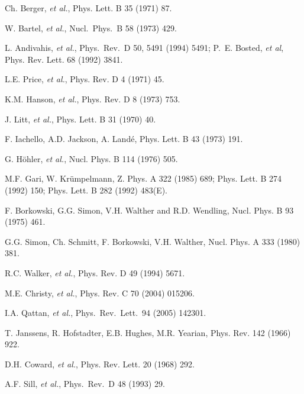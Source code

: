 \begin{thebibliography}{PPV06}
Ch. Berger, {\it et al.}, Phys. Lett. B  35 (1971) 87.

W. Bartel, {\it et al.},
Nucl.\ Phys.\ B  58 (1973) 429.

L. Andivahis, {\it et al.},
Phys.\ Rev.\ D  50, 5491 (1994) 5491;
P.~E. Bosted, {\it et al}, Phys. Rev. Lett.  68 (1992) 3841. 

L.E. Price, {\it et al.}, Phys. Rev. D  4 (1971) 45.

K.M. Hanson, {\it et al.}, Phys. Rev. D  8 (1973) 753.

J. Litt, {\it et al.}, Phys. Lett. B  31 (1970) 40.

F. Iachello, A.D. Jackson, A. Land\'e, Phys. Lett. B  43 (1973) 191. 

G. H\"ohler, {\it et al.}, Nucl. Phys. B  114 (1976) 505.

M.F. Gari, W. Kr\"umpelmann, Z. Phys. A  322 (1985) 689; 
Phys. Lett. B  274 (1992) 150; 
Phys. Lett. B  282 (1992) 483(E).

F. Borkowski, G.G. Simon, V.H. Walther and R.D. Wendling, Nucl. Phys. B  93 (1975) 461.

G.G. Simon, Ch. Schmitt, F. Borkowski, V.H. Walther, Nucl. Phys. A  333 (1980) 381.

R.C. Walker, {\it et al.}, Phys. Rev. D  49 (1994) 5671.

M.E. Christy, {\it et al.}, Phys. Rev. C  70 (2004) 015206.

I.A. Qattan, {\it et al.},
  Phys.\ Rev.\ Lett.\   94 (2005) 142301.

T. Janssens, R. Hofstadter, E.B. Hughes, M.R. Yearian,
Phys. Rev.  142 (1966) 922.

D.H. Coward, {\it et al.}, Phys. Rev. Lett.  20 (1968) 292.

A.F. Sill, {\it et al.},
Phys.\ Rev.\ D  48 (1993) 29.


\end{thebibliography}

